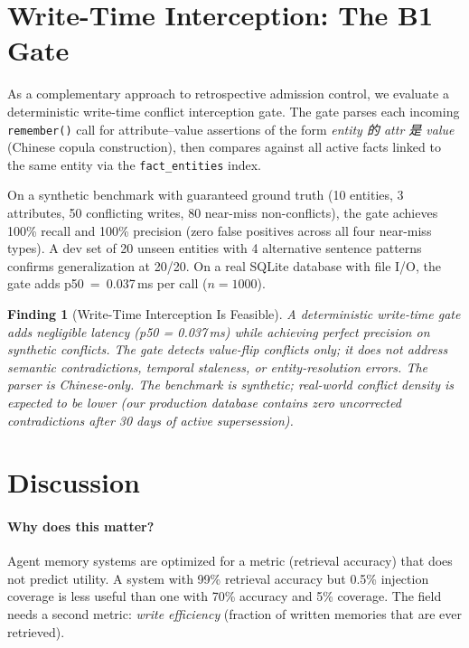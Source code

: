 \documentclass[11pt]{article}
\newtheorem{finding}{Finding}
\begin{document}
\section{Write-Time Interception: The B1 Gate}
\label{sec:b1}

As a complementary approach to retrospective admission control, we evaluate a deterministic write-time conflict interception gate. The gate parses each incoming \texttt{remember()} call for attribute--value assertions of the form \emph{entity 的 attr 是 value} (Chinese copula construction), then compares against all active facts linked to the same entity via the \texttt{fact\_entities} index.

On a synthetic benchmark with guaranteed ground truth (10 entities, 3 attributes, 50 conflicting writes, 80 near-miss non-conflicts), the gate achieves 100\% recall and 100\% precision (zero false positives across all four near-miss types). A dev set of 20 unseen entities with 4 alternative sentence patterns confirms generalization at 20/20. On a real SQLite database with file I/O, the gate adds p50~=~0.037\,ms per call ($n{=}1000$).

\begin{finding}[Write-Time Interception Is Feasible]
A deterministic write-time gate adds negligible latency (p50 = 0.037\,ms) while achieving perfect precision on synthetic conflicts. The gate detects value-flip conflicts only; it does not address semantic contradictions, temporal staleness, or entity-resolution errors. The parser is Chinese-only. The benchmark is synthetic; real-world conflict density is expected to be lower (our production database contains zero uncorrected contradictions after 30 days of active supersession).
\end{finding}

\section{Discussion}

\paragraph{Why does this matter?} Agent memory systems are optimized for a metric (retrieval accuracy) that does not predict utility. A system with 99\% retrieval accuracy but 0.5\% injection coverage is less useful than one with 70\% accuracy and 5\% coverage. The field needs a second metric: \emph{write efficiency} (fraction of written memories that are ever retrieved).
\end{document}
